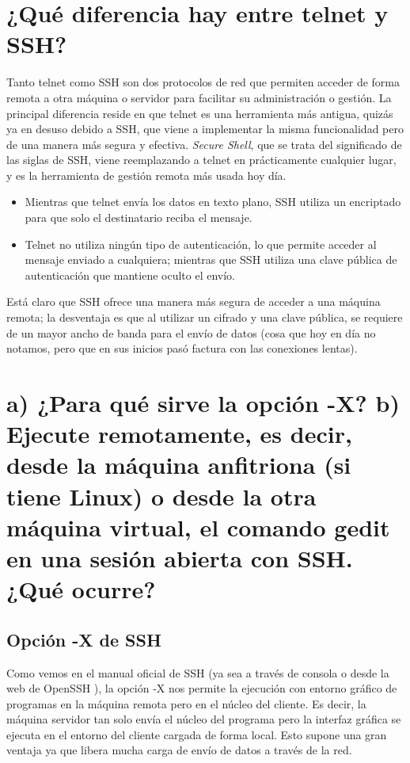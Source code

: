 \section{¿Qué diferencia hay entre telnet y SSH?}
Tanto telnet como SSH son dos protocolos de red que permiten acceder de forma remota a otra máquina o servidor para facilitar su administración o gestión. La principal diferencia reside en que telnet es una herramienta más antigua, quizás ya en desuso debido a SSH, que viene a implementar la misma funcionalidad pero de una manera más segura y efectiva. \emph{Secure Shell}, que se trata del significado de las siglas de SSH, viene reemplazando a telnet en prácticamente cualquier lugar, y es la herramienta de gestión remota más usada hoy día.
\begin{itemize}
	\item Mientras que telnet envía los datos en texto plano, SSH utiliza un encriptado para que solo el destinatario reciba el mensaje.
	\item Telnet no utiliza ningún tipo de autenticación, lo que permite acceder al mensaje enviado a cualquiera; mientras que SSH utiliza una clave pública de autenticación que mantiene oculto el envío.
\end{itemize}
Está claro que SSH ofrece una manera más segura de acceder a una máquina remota; la desventaja es que al utilizar un cifrado y una clave pública, se requiere de un mayor ancho de banda para el envío de datos (cosa que hoy en día no notamos, pero que en sus inicios pasó factura con las conexiones lentas).


\section{a) ¿Para qué sirve la opción -X? b) Ejecute remotamente, es decir, desde la máquina anfitriona (si tiene Linux) o desde la otra máquina virtual, el comando gedit en una sesión abierta con SSH. ¿Qué ocurre?}

	\subsection{Opción -X de SSH}
	Como vemos en el manual oficial de SSH (ya sea a través de consola o desde la web de OpenSSH \cite{ssh-man}), la opción -X nos permite la ejecución con entorno gráfico de programas en la máquina remota pero en el núcleo del cliente. Es decir, la máquina servidor tan solo envía el núcleo del programa pero la interfaz gráfica se ejecuta en el entorno del cliente cargada de forma local. Esto supone una gran ventaja ya que libera mucha carga de envío de datos a través de la red.
		
